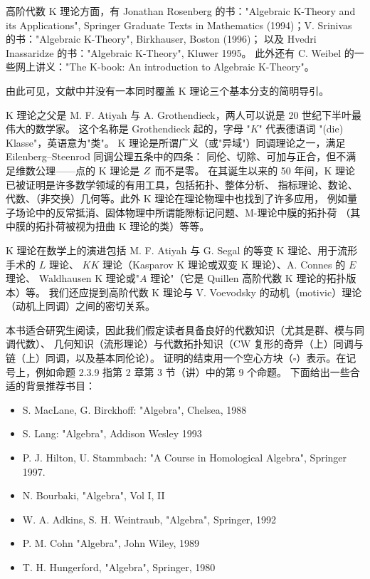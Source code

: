 高阶代数 K 理论方面，有 Jonathan Rosenberg 的书："Algebraic K-Theory and its Applications",
Springer Graduate Texts in Mathematics (1994)；V. Srinivas 的书："Algebraic K-Theory", Birkhauser, Boston (1996)；
以及 Hvedri Inassaridze 的书："Algebraic K-Theory", Kluwer 1995。
此外还有 C. Weibel 的一些网上讲义："The K-book: An introduction to Algebraic K-Theory"。

由此可见，文献中并没有一本同时覆盖 K 理论三个基本分支的简明导引。

K 理论之父是 M. F. Atiyah 与 A. Grothendieck，两人可以说是 20 世纪下半叶最伟大的数学家。
这个名称是 Grothendieck 起的，字母 "$K$" 代表德语词 "(die) Klasse"，英语意为"类"。
K 理论是所谓广义（或"异域"）同调理论之一，满足 Eilenberg--Steenrod 同调公理五条中的四条：
同伦、切除、可加与正合，但不满足维数公理——点的 K 理论是 $Z$ 而不是零。
在其诞生以来的 50 年间，K 理论已被证明是许多数学领域的有用工具，包括拓扑、整体分析、
指标理论、数论、代数、（非交换）几何等。此外 K 理论在理论物理中也找到了许多应用，
例如量子场论中的反常抵消、固体物理中所谓能隙标记问题、M-理论中膜的拓扑荷
（其中膜的拓扑荷被视为扭曲 K 理论的类）等等。

K 理论在数学上的演进包括 M. F. Atiyah 与 G. Segal 的等变 K 理论、用于流形手术的 $L$ 理论、
$KK$ 理论（Kasparov K 理论或双变 K 理论）、A. Connes 的 $E$ 理论、
Waldhausen K 理论或"$A$ 理论"（它是 Quillen 高阶代数 K 理论的拓扑版本）等。
我们还应提到高阶代数 K 理论与 V. Voevodsky 的动机（motivic）理论（动机上同调）之间的密切关系。

本书适合研究生阅读，因此我们假定读者具备良好的代数知识（尤其是群、模与同调代数）、
几何知识（流形理论）与代数拓扑知识（CW 复形的奇异（上）同调与链（上）同调，以及基本同伦论）。
证明的结束用一个空心方块（$\square$）表示。在记号上，例如命题 2.3.9 指第 2 章第 3 节（讲）中的第 9 个命题。
下面给出一些合适的背景推荐书目：

\begin{itemize}[leftmargin=1.6em,itemsep=1pt]
  \item S. MacLane, G. Birckhoff: "Algebra", Chelsea, 1988
  \item S. Lang: "Algebra", Addison Wesley 1993
  \item P. J. Hilton, U. Stammbach: "A Course in Homological Algebra", Springer 1997.
  \item N. Bourbaki, "Algebra", Vol I, II
  \item W. A. Adkins, S. H. Weintraub, "Algebra", Springer, 1992
  \item P. M. Cohn "Algebra", John Wiley, 1989
  \item T. H. Hungerford, "Algebra", Springer, 1980
\end{itemize}

